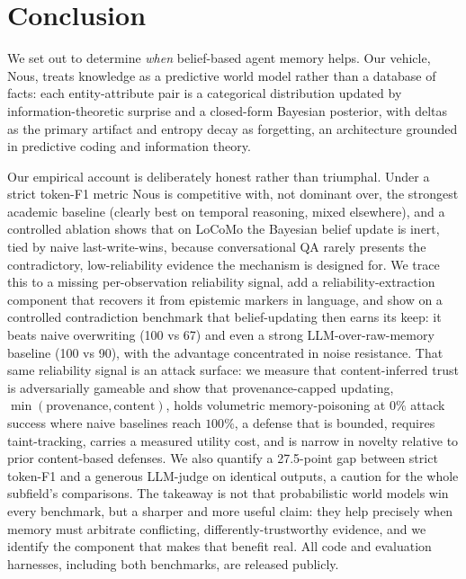 \documentclass[11pt,a4paper,twocolumn]{article}
\begin{document}
\section{Conclusion}

We set out to determine \emph{when} belief-based agent memory helps. Our vehicle,
Nous, treats knowledge as a predictive world model rather than a database of facts:
each entity-attribute pair is a categorical distribution updated by
information-theoretic surprise and a closed-form Bayesian posterior, with deltas as
the primary artifact and entropy decay as forgetting, an architecture grounded in
predictive coding and information theory.

Our empirical account is deliberately honest rather than triumphal. Under a
strict token-F1 metric Nous is competitive with, not dominant over, the
strongest academic baseline (clearly best on temporal reasoning, mixed
elsewhere), and a controlled ablation shows that on LoCoMo the Bayesian belief
update is inert, tied by naive last-write-wins, because conversational QA rarely
presents the contradictory, low-reliability evidence the mechanism is designed
for. We trace this to a missing per-observation reliability signal, add a
reliability-extraction component that recovers it from epistemic markers in
language, and show on a controlled contradiction benchmark that belief-updating
then earns its keep: it beats naive overwriting (100 vs 67) and even a strong
LLM-over-raw-memory baseline (100 vs 90), with the advantage concentrated in
noise resistance. That same reliability signal is an attack surface: we measure
that content-inferred trust is adversarially gameable and show that
provenance-capped updating, $\min(\text{provenance},\text{content})$, holds
volumetric memory-poisoning at $0\%$ attack success where naive baselines reach
$100\%$, a defense that is bounded, requires taint-tracking, carries a measured
utility cost, and is narrow in novelty relative to prior content-based defenses.
We also quantify a 27.5-point gap between strict token-F1 and a generous
LLM-judge on identical outputs, a caution for the whole subfield's comparisons. The takeaway is not that probabilistic world models win every
benchmark, but a sharper and more useful claim: they help precisely when memory
must arbitrate conflicting, differently-trustworthy evidence, and we identify
the component that makes that benefit real. All code and evaluation harnesses,
including both benchmarks, are released publicly.

\clearpage


\end{document}
